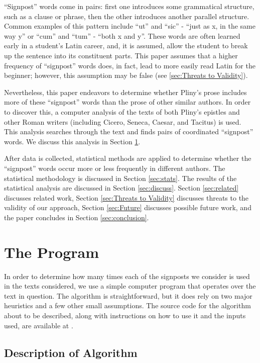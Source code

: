 ``Signpost'' words come in pairs: first one introduces some grammatical structure, such as a clause or phrase, then the other introduces another parallel structure. Common examples of this pattern include ``ut'' and ``sic'' - ``just as x, in the same way y'' or ``cum'' and ``tum'' - ``both x and y''. These words are often learned early in a student's Latin career, and, it is assumed, allow the student to break up the sentence into its constituent parts. This paper assumes that a higher frequency of ``signpost'' words does, in fact, lead to more easily read Latin for the beginner; however, this assumption may be false (see \ref{sec:Threats to Validity}).

Nevertheless, this paper endeavors to determine whether Pliny's prose includes more of these ``signpost'' words than the prose of other similar authors. In order to discover this, a computer analysis of the texts of both Pliny's epistles and other Roman writers (including Cicero, Seneca, Caesar, and Tacitus) is used. This analysis searches through the text and finds pairs of coordinated ``signpost'' words. We discuss this analysis in Section \ref{sec:The Program}.
 
After data is collected, statistical methods are applied to determine whether the ``signpost'' words occur more or less frequently in different authors. The statistical methodology is discussed in Section \ref{sec:stats}. The results of the statistical analysis are discussed in Section \ref{sec:discuss}. Section \ref{sec:related} discusses related work, Section \ref{sec:Threats to Validity} discusses threats to the validity of our approach, Section \ref{sec:Future} discusses possible future work, and the paper concludes in Section \ref{sec:conclusion}.

\section{The Program}
\label{sec:The Program}

In order to determine how many times each of the signposts we consider is used in the texts considered, we use a simple computer program that operates over the text in question. The algorithm is straightforward, but it does rely on two major heuristics and a few other small assumptions. The source code for the algorithm about to be described, along with instructions on how to use it and the inputs used, are available at \cite{github}.

\subsection{Description of Algorithm}

